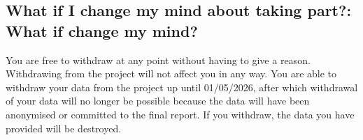 

\subsection*{What if I change my mind about taking part?\label{sec:withdrawal}: What if change my mind?}
You are free to withdraw at any point without having to give a reason. Withdrawing from the project will not affect you in any way. You are able to withdraw your data from the project up until 01/05/2026, after which withdrawal of your data will no longer be possible because the data will have been anonymised or committed to the final report. If you withdraw, the data you have provided will be destroyed.


 